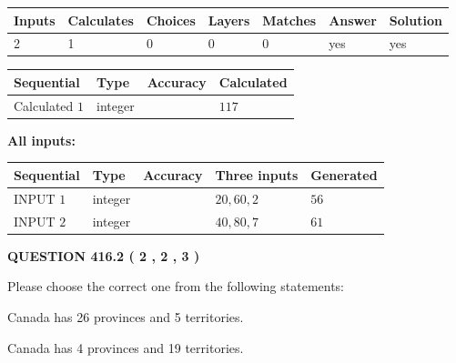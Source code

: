 \documentclass[12pt]{article}
\begin{document}
   
   
   
\noindent\begin{tabular}{|l|l|l|l|l|l|l|}
 \hline
Inputs & Calculates & Choices & Layers & Matches & Answer & Solution \\ \hline
 2  & 
 1  & 
 0
  & 
 0  & 
 0  & 
  yes & 
  yes 
  \\ \hline
 \end{tabular}
   
   
   
   
\noindent{}
   
   
  
  
\noindent\begin{tabular}{|l|l|l|l|}
\hline
 Sequential & Type & Accuracy & Calculated \\ 
\hline
 
 
  Calculated $  1 $ & integer &  & 
  $ 117 $ 
 \\  \hline  
 \end{tabular}
   
   
   
   
\noindent\vspace{0.1in}\hspace{-0.08in} {\textbf{\Large{All inputs: }}}
   
   
  
  
\noindent\begin{tabular}{|l|l|l|l|l|}
\hline
 Sequential & Type & Accuracy & Three inputs & Generated \\ 
\hline
 
 
  INPUT $  1 $ & integer &  & $
 20
 , 
 60
 , 
 2
 $ & $ 56 $ 
 \\  \hline  
 
 
  INPUT $  2 $ & integer &  & $
 40
 , 
 80
 , 
 7
 $ & $ 61 $ 
 \\  \hline  
 \end{tabular}
   
   
  
\vspace{0.2in}
  
{\textbf{\Large{QUESTION
416.2 
 ( 2 , 2 , 3 )
}}}
  
  
Please choose the correct one from the following statements:
 
 
Canada has  26 provinces and  5 territories.
 
 
Canada has   4 provinces and  19 territories.
 
\end{document}
